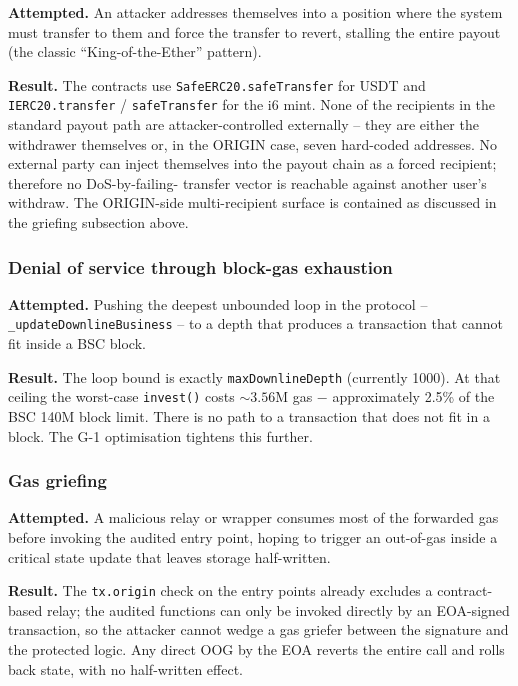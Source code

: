 \documentclass[11pt,a4paper]{article}
\begin{document}
\textbf{Attempted.} An attacker addresses themselves into a position where
the system must transfer to them and force the transfer to revert,
stalling the entire payout (the classic ``King-of-the-Ether'' pattern).

\textbf{Result.} The contracts use \texttt{SafeERC20.safeTransfer} for USDT
and \texttt{IERC20.transfer} / \texttt{safeTransfer} for the i6 mint. None
of the recipients in the standard payout path are attacker-controlled
externally -- they are either the withdrawer themselves or, in the ORIGIN
case, seven hard-coded addresses. No external party can inject themselves
into the payout chain as a forced recipient; therefore no DoS-by-failing-
transfer vector is reachable against another user's withdraw. The
ORIGIN-side multi-recipient surface is contained as discussed in the
griefing subsection above.

\subsubsection*{Denial of service through block-gas exhaustion}

\textbf{Attempted.} Pushing the deepest unbounded loop in the protocol --
\texttt{\_updateDownlineBusiness} -- to a depth that produces a transaction
that cannot fit inside a BSC block.

\textbf{Result.} The loop bound is exactly \texttt{maxDownlineDepth}
(currently 1000). At that ceiling the worst-case \texttt{invest()} costs
$\sim 3.56$M gas $-$ approximately 2.5\% of the BSC 140M block limit. There
is no path to a transaction that does not fit in a block. The G-1
optimisation tightens this further.

\subsubsection*{Gas griefing}

\textbf{Attempted.} A malicious relay or wrapper consumes most of the
forwarded gas before invoking the audited entry point, hoping to trigger an
out-of-gas inside a critical state update that leaves storage half-written.

\textbf{Result.} The \texttt{tx.origin} check on the entry points already
excludes a contract-based relay; the audited functions can only be invoked
directly by an EOA-signed transaction, so the attacker cannot wedge a gas
griefer between the signature and the protected logic. Any direct OOG by
the EOA reverts the entire call and rolls back state, with no
half-written effect.
\end{document}
